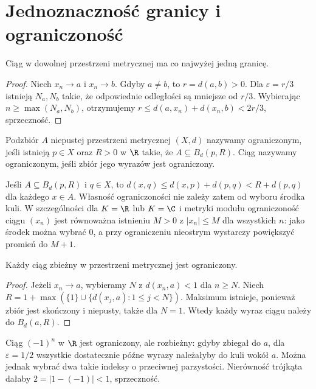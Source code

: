 \section{Jednoznaczność granicy i ograniczoność}
\begin{twierdzenie}
\label{ma1:thm:unique-limit}
Ciąg w dowolnej przestrzeni metrycznej ma co najwyżej jedną granicę.
\end{twierdzenie}
\begin{proof}
Niech $x_n\to a$ i $x_n\to b$. Gdyby $a\ne b$, to $r=d(a,b)>0$. Dla $\varepsilon=r/3$ istnieją $N_a,N_b$ takie, że odpowiednie odległości są mniejsze od $r/3$. Wybierając $n\ge\max(N_a,N_b)$, otrzymujemy
$r\le d(a,x_n)+d(x_n,b)<2r/3$, sprzeczność.
\end{proof}

\begin{definicja}
\label{ma1:def:bounded-metric-set}
Podzbiór $A$ niepustej przestrzeni metrycznej $(X,d)$ nazywamy ograniczonym, jeśli istnieją $p\in X$ oraz $R>0$ w $\R$ takie, że $A\subseteq B_d(p,R)$. Ciąg nazywamy ograniczonym, jeśli zbiór jego wyrazów jest ograniczony.
\end{definicja}
Jeśli $A\subseteq B_d(p,R)$ i $q\in X$, to $d(x,q)\le d(x,p)+d(p,q)<R+d(p,q)$ dla każdego $x\in A$. Własność ograniczoności nie zależy zatem od wyboru środka kuli. W szczególności dla $K=\R$ lub $K=\C$ i metryki modułu ograniczoność ciągu $(x_n)$ jest równoważna istnieniu $M>0$ z $|x_n|\le M$ dla wszystkich $n$: jako środek można wybrać $0$, a przy ograniczeniu nieostrym wystarczy powiększyć promień do $M+1$.
\begin{twierdzenie}
\label{ma1:thm:convergent-bounded}
Każdy ciąg zbieżny w przestrzeni metrycznej jest ograniczony.
\end{twierdzenie}
\begin{proof}
Jeżeli $x_n\to a$, wybieramy $N$ z $d(x_n,a)<1$ dla $n\ge N$. Niech
$R=1+\max(\{1\}\cup\{d(x_j,a):1\le j<N\})$. Maksimum istnieje, ponieważ zbiór jest skończony i niepusty, także dla $N=1$. Wtedy każdy wyraz ciągu należy do $B_d(a,R)$.
\end{proof}
\begin{przyklad}
Ciąg $(-1)^n$ w $\R$ jest ograniczony, ale rozbieżny: gdyby zbiegał do $a$, dla $\varepsilon=1/2$ wszystkie dostatecznie późne wyrazy należałyby do kuli wokół $a$. Można jednak wybrać dwa takie indeksy o przeciwnej parzystości. Nierówność trójkąta dałaby $2=|1-(-1)|<1$, sprzeczność.
\end{przyklad}

